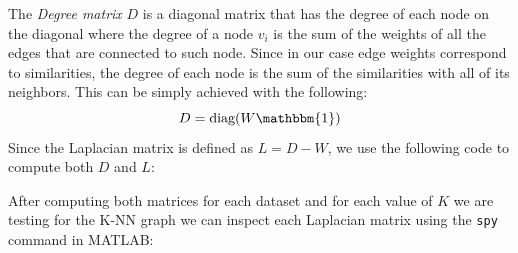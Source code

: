 The \textit{Degree matrix} \(D\) is a diagonal matrix that has the degree of each node on the diagonal where the degree of a node \(v_i\) is the sum of the weights of all the edges that are connected to such node. Since in our case edge weights correspond to similarities, the degree of each node is the sum of the similarities with all of its neighbors. This can be simply achieved with the following:
\begin{equation}
    D = \text{diag}(W \mathbbm{1})
\end{equation}
Since the Laplacian matrix is defined as \(L= D - W\), we use the following code to compute both \(D\) and \(L\):

After computing both matrices for each dataset and for each value of \(K\) we are testing for the K-NN graph we can inspect each Laplacian matrix using the \texttt{spy} command in MATLAB:

